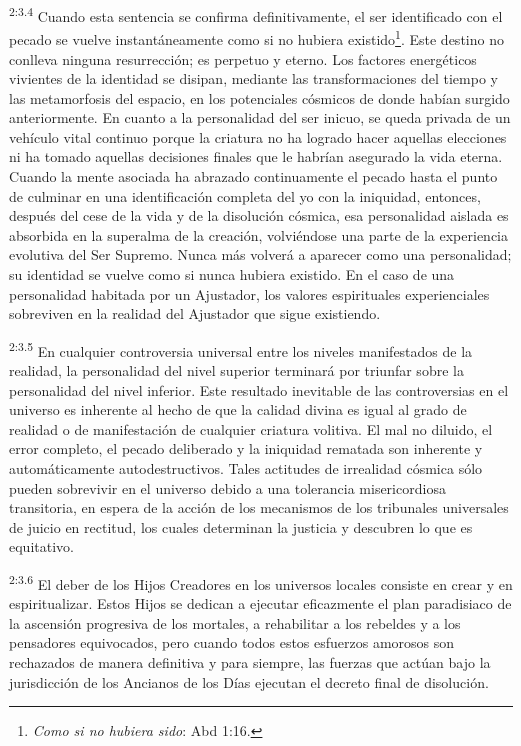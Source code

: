 \par
\textsuperscript{2:3.4} Cuando esta sentencia se confirma definitivamente, el ser identificado con el pecado se vuelve instantáneamente como si no hubiera existido\footnote{\textit{Como si no hubiera sido}: Abd 1:16.}. Este destino no conlleva ninguna resurrección; es perpetuo y eterno. Los factores energéticos vivientes de la identidad se disipan, mediante las transformaciones del tiempo y las metamorfosis del espacio, en los potenciales cósmicos de donde habían surgido anteriormente. En cuanto a la personalidad del ser inicuo, se queda privada de un vehículo vital continuo porque la criatura no ha logrado hacer aquellas elecciones ni ha tomado aquellas decisiones finales que le habrían asegurado la vida eterna. Cuando la mente asociada ha abrazado continuamente el pecado hasta el punto de culminar en una identificación completa del yo con la iniquidad, entonces, después del cese de la vida y de la disolución cósmica, esa personalidad aislada es absorbida en la superalma de la creación, volviéndose una parte de la experiencia evolutiva del Ser Supremo. Nunca más volverá a aparecer como una personalidad; su identidad se vuelve como si nunca hubiera existido. En el caso de una personalidad habitada por un Ajustador, los valores espirituales experienciales sobreviven en la realidad del Ajustador que sigue existiendo.

\par
\textsuperscript{2:3.5} En cualquier controversia universal entre los niveles manifestados de la realidad, la personalidad del nivel superior terminará por triunfar sobre la personalidad del nivel inferior. Este resultado inevitable de las controversias en el universo es inherente al hecho de que la calidad divina es igual al grado de realidad o de manifestación de cualquier criatura volitiva. El mal no diluido, el error completo, el pecado deliberado y la iniquidad rematada son inherente y automáticamente autodestructivos. Tales actitudes de irrealidad cósmica sólo pueden sobrevivir en el universo debido a una tolerancia misericordiosa transitoria, en espera de la acción de los mecanismos de los tribunales universales de juicio en rectitud, los cuales determinan la justicia y descubren lo que es equitativo.

\par
\textsuperscript{2:3.6} El deber de los Hijos Creadores en los universos locales consiste en crear y en espiritualizar. Estos Hijos se dedican a ejecutar eficazmente el plan paradisiaco de la ascensión progresiva de los mortales, a rehabilitar a los rebeldes y a los pensadores equivocados, pero cuando todos estos esfuerzos amorosos son rechazados de manera definitiva y para siempre, las fuerzas que actúan bajo la jurisdicción de los Ancianos de los Días ejecutan el decreto final de disolución.

